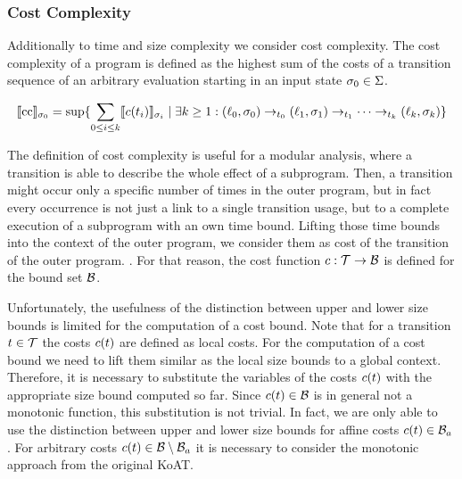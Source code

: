 \subsubsection{Cost Complexity}

Additionally to time and size complexity we consider cost complexity.
The cost complexity of a program is defined as the highest sum of the costs of a transition sequence of an arbitrary evaluation starting in an input state $\sigma_0 \in \Sigma$.

\begin{definition}
\[ \llbracket \text{cc} \rrbracket_{\sigma_0} = \sup \lbrace  \sum_{0 \leq i \leq k} \llbracket c(t_i) \rrbracket_{\sigma_i} \mid \exists k \geq 1: 
  (\ell_0, \sigma_0) \rightarrow_{t_0} (\ell_1, \sigma_1) \rightarrow_{t_1} \dots \rightarrow_{t_k} (\ell_k, \sigma_k)  \rbrace \]
\end{definition}

The definition of cost complexity is useful for a modular analysis, where a transition is able to describe the whole effect of a subprogram.
Then, a transition might occur only a specific number of times in the outer program, but in fact every occurrence is not just a link to a single transition usage, but to a complete execution of a subprogram with an own time bound.
Lifting those time bounds into the context of the outer program, we consider them as cost of the transition of the outer program. .
For that reason, the cost function $c: \mathcal{T} \rightarrow \mathcal{B}$ is defined for the bound set $\mathcal{B}$.

Unfortunately, the usefulness of the distinction between upper and lower size bounds is limited for the computation of a cost bound.
Note that for a transition $t \in \mathcal{T}$ the costs $c(t)$ are defined as local costs.
For the computation of a cost bound we need to lift them similar as the local size bounds to a global context.
Therefore, it is necessary to substitute the variables of the costs $c(t)$ with the appropriate size bound computed so far.
Since $c(t) \in \mathcal{B}$ is in general not a monotonic function, this substitution is not trivial.
In fact, we are only able to use the distinction between upper and lower size bounds for affine costs $c(t) \in \mathcal{B}_a$.
For arbitrary costs $c(t) \in \mathcal{B} \setminus \mathcal{B}_a$ it is necessary to consider the monotonic approach from the original KoAT.

